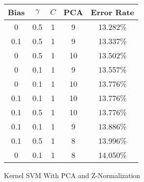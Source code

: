 \begin{center}
\begin{tabular}{|c|c|c|c|c|}
\hline
Bias & $\gamma$ & $C$ & PCA & Error Rate \\
\hline
0 & 0.5 & 1 & 9 & 13.282\% \\
\hline
0.1 & 0.5 & 1 & 9 & 13.337\% \\
\hline
0 & 0.5 & 1 & 10 & 13.502\% \\
\hline
0 & 0.1 & 1 & 9 & 13.557\% \\
\hline
0 & 0.1 & 1 & 10 & 13.776\% \\
\hline
0.1 & 0.1 & 1 & 10 & 13.776\% \\
\hline
0.1 & 0.5 & 1 & 10 & 13.776\% \\
\hline
0.1 & 0.1 & 1 & 9 & 13.886\% \\
\hline
0.1 & 0.5 & 1 & 8 & 13.996\% \\
\hline
0 & 0.1 & 1 & 8 & 14.050\% \\
\hline
\end{tabular}
\end{center}
\caption{Kernel SVM With PCA and Z-Normalization}\label{tab:svm_rbfpcan_acctable}
